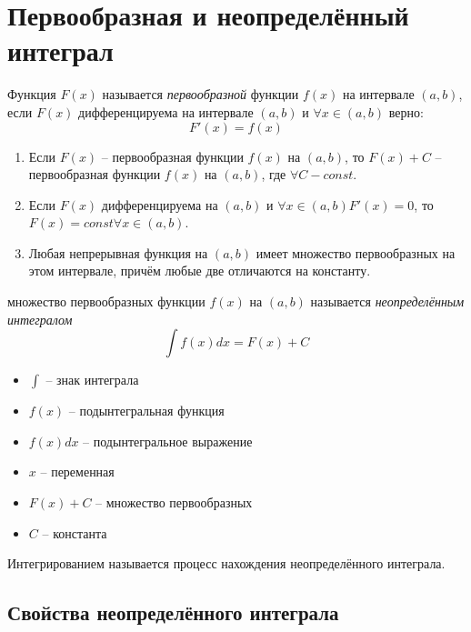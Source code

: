 \section{Первообразная и неопределённый интеграл}

\begin{definition}[первообразная]
    Функция $F(x)$ называется \textit{первообразной} функции $f(x)$ на интервале $(a, b)$, если $F(x)$ дифференцируема на интервале $(a, b)$ и $\forall x \in (a, b)$ верно: \[
        F'(x) = f(x)
    \]
\end{definition}

\begin{enumerate}
    \item Если $F(x)$ -- первообразная функции $f(x)$ на $(a, b)$, то $F(x) + C$ -- первообразная функции $f(x)$ на $(a, b)$, где $\forall C - const$.
    \item  Если $F(x)$ дифференцируема на $(a, b)$ и $\forall x \in (a, b) F'(x) = 0$, то $F(x) = const \forall x \in (a, b)$.
    \item Любая непрерывная функция на  $(a, b)$  имеет множество первообразных на этом интервале, причём любые две отличаются на константу.
\end{enumerate}

\begin{definition}
    множество первообразных функции $f(x)$ на $(a, b)$ называется \textit{неопределённым интегралом} \[
        \int f(x)dx = F(x) + C
    \]
\end{definition}

\begin{itemize}
    \item $\int$ -- знак интеграла
    \item $f(x)$ -- подынтегральная функция
    \item $f(x)dx$ -- подынтегральное выражение
    \item $x$ -- переменная
    \item $F(x) + C$ -- множество первообразных
    \item $C$ -- константа
\end{itemize}

\begin{definition}[Интегрирование]
    Интегрированием называется процесс нахождения неопределённого интеграла.
\end{definition}

\subsection{Свойства неопределённого интеграла}


